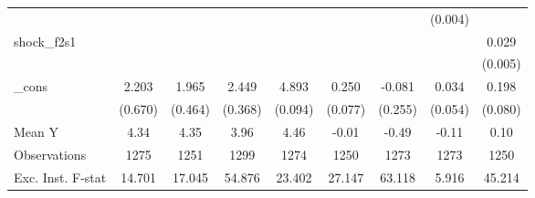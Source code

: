 {\begin{tabular}{l*{8}{c}}
            &                     &                     &                     &                     &                     &                     &     (0.004)         &                     \\
\addlinespace
shock\_f2s1  &                     &                     &                     &                     &                     &                     &                     &       0.029\sym{***}\\
            &                     &                     &                     &                     &                     &                     &                     &     (0.005)         \\
\addlinespace
\_cons      &       2.203\sym{***}&       1.965\sym{***}&       2.449\sym{***}&       4.893\sym{***}&       0.250\sym{***}&      -0.081         &       0.034         &       0.198\sym{**} \\
            &     (0.670)         &     (0.464)         &     (0.368)         &     (0.094)         &     (0.077)         &     (0.255)         &     (0.054)         &     (0.080)         \\
\midrule
Mean Y      &        4.34         &        4.35         &        3.96         &        4.46         &       -0.01         &       -0.49         &       -0.11         &        0.10         \\
Observations&        1275         &        1251         &        1299         &        1274         &        1250         &        1273         &        1273         &        1250         \\
Exc. Inst. F-stat&      14.701         &      17.045         &      54.876         &      23.402         &      27.147         &      63.118         &       5.916         &      45.214         \\
\bottomrule
\end{tabular}
}
